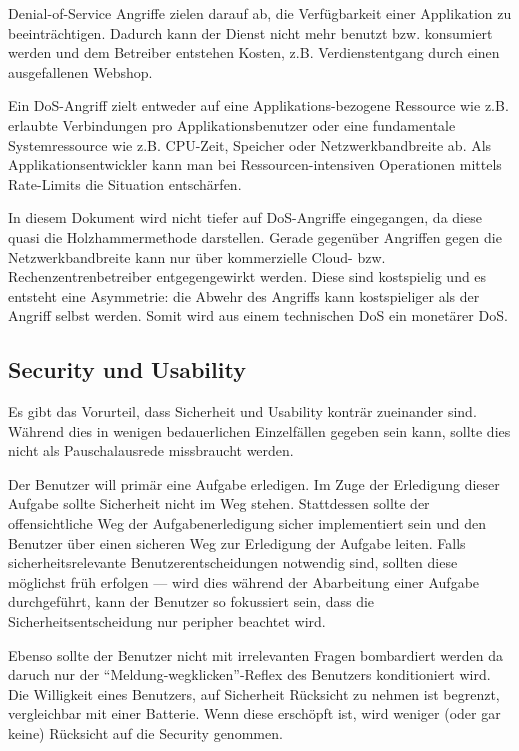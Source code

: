 Denial-of-Service Angriffe zielen darauf ab, die Verfügbarkeit einer Applikation zu beeinträchtigen. Dadurch kann der Dienst nicht mehr benutzt bzw. konsumiert werden und dem Betreiber entstehen Kosten, z.B. Verdienstentgang durch einen ausgefallenen Webshop.

Ein DoS-Angriff zielt entweder auf eine Applikations-bezogene Ressource wie z.B. erlaubte Verbindungen pro Applikationsbenutzer oder eine fundamentale Systemressource wie z.B. CPU-Zeit, Speicher oder Netzwerkbandbreite ab. Als Applikationsentwickler kann man bei Ressourcen-intensiven Operationen mittels Rate-Limits die Situation entschärfen.

In diesem Dokument wird nicht tiefer auf DoS-Angriffe eingegangen, da diese quasi die Holzhammermethode darstellen. Gerade gegenüber Angriffen gegen die Netzwerkbandbreite kann nur über kommerzielle Cloud- bzw. Rechenzentrenbetreiber entgegengewirkt werden. Diese sind kostspielig und es entsteht eine Asymmetrie: die Abwehr des Angriffs kann kostspieliger als der Angriff selbst werden. Somit wird aus einem technischen DoS ein monetärer DoS.

\subsection{Security und Usability}

Es gibt das Vorurteil, dass Sicherheit und Usability konträr zueinander sind. Während dies in wenigen bedauerlichen Einzelfällen gegeben sein kann, sollte dies nicht als Pauschalausrede missbraucht werden.

Der Benutzer will primär eine Aufgabe erledigen. Im Zuge der Erledigung dieser Aufgabe sollte Sicherheit nicht im Weg stehen. Stattdessen sollte der offensichtliche Weg der Aufgabenerledigung sicher implementiert sein und den Benutzer über einen sicheren Weg zur Erledigung der Aufgabe leiten. Falls sicherheitsrelevante Benutzerentscheidungen notwendig sind, sollten diese möglichst früh erfolgen --- wird dies während der Abarbeitung einer Aufgabe durchgeführt, kann der Benutzer so fokussiert sein, dass die Sicherheitsentscheidung nur peripher beachtet wird.

Ebenso sollte der Benutzer nicht mit irrelevanten Fragen bombardiert werden da daruch nur  der ``Meldung-wegklicken''-Reflex des Benutzers konditioniert wird. Die Willigkeit eines Benutzers, auf Sicherheit Rücksicht zu nehmen ist begrenzt, vergleichbar mit einer Batterie. Wenn diese erschöpft ist, wird weniger (oder gar keine) Rücksicht auf die Security genommen.

